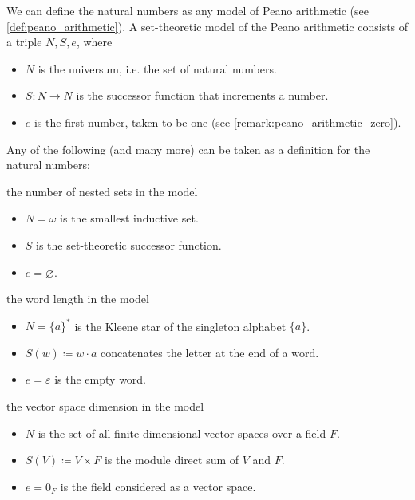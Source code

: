 \begin{definition}\label{def:peano_arithmetic_models}
  We can define the natural numbers as any model of Peano arithmetic (see \cref{def:peano_arithmetic}). A set-theoretic model of the Peano arithmetic consists of a triple \( N, S, e \), where
  \begin{itemize}
    \item \( N \) is the universum, i.e. the set of natural numbers.
    \item \( S: N \to N \) is the successor function that increments a number.
    \item \( e \) is the first number, taken to be one (see \cref{remark:peano_arithmetic_zero}).
  \end{itemize}

  Any of the following (and many more) can be taken as a definition for the natural numbers:
  \begin{defenum}
     the number of nested sets in the model
    \begin{itemize}
      \item \( N = \omega \) is the smallest inductive set.
      \item \( S \) is the set-theoretic successor function.
      \item \( e = \varnothing \).
    \end{itemize}

     the word length in the model
    \begin{itemize}
      \item \( N = \{ a \}^{*} \) is the Kleene star of the singleton alphabet \( \{ a \} \).
      \item \( S(w) \coloneqq w \cdot a \) concatenates the letter at the end of a word.
      \item \( e = \varepsilon \) is the empty word.
    \end{itemize}

     the vector space dimension in the model
    \begin{itemize}
      \item \( N \) is the set of all finite-dimensional vector spaces over a field \( F \).
      \item \( S(V) \coloneqq V \times F \) is the module direct sum of \( V \) and \( F \).
      \item \( e = 0_F \) is the field considered as a vector space.
    \end{itemize}
  \end{defenum}
\end{definition}

